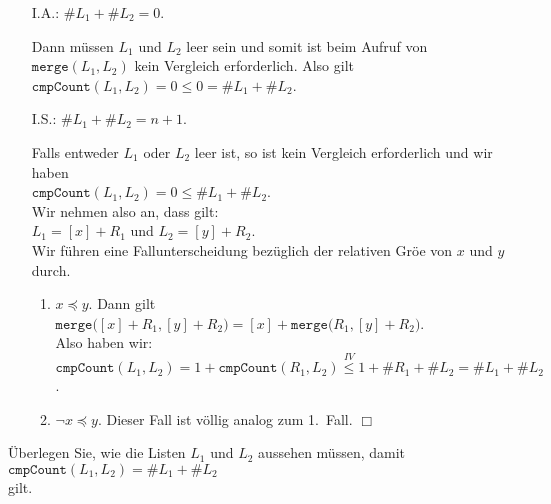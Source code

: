 \begin{enumerate}
\item[I.A.:] $\#L_1 + \#L_2=0$.

             Dann m\"ussen $L_1$ und $L_2$ leer sein und somit ist beim Aufruf
             von $\mathtt{merge}(L_1, L_2)$ kein Vergleich erforderlich.  Also gilt \\[0.2cm]
             \hspace*{1.3cm} $\mathtt{cmpCount}(L_1, L_2) = 0 \leq 0 = \#L_1 + \#L_2$.
\item[I.S.:] $\#L_1 + \#L_2 = n+1$.

             Falls entweder $L_1$ oder $L_2$ leer ist, so ist kein Vergleich erforderlich
             und wir haben 
             \\[0.2cm]
             \hspace*{1.3cm}
             $\mathtt{cmpCount}(L_1,L_2) = 0 \leq \#L_1 + \#L_2$.
             \\[0.2cm]
             Wir nehmen also an, dass gilt: \\[0.2cm]
             \hspace*{1.3cm} $L_1 = [x] + R_1$ \quad und \quad $L_2 = [y] + R_2$.
             \\[0.2cm]
             Wir f\"uhren eine Fallunterscheidung bez\"uglich der relativen Gr\"o\3e von $x$ und $y$ 
             durch.
             \begin{enumerate}
             \item $x \preceq y$.  Dann gilt \\[0.2cm]
                   \hspace*{1.3cm} 
                   $\mathtt{merge}\bigl([x] + R_1, [y] + R_2\bigr) = [x] +
                   \mathtt{merge}\bigl(R_1, [y] + R_2\bigr)$. \\[0.2cm]
                   Also haben wir: \\[0.2cm]
                   \hspace*{1.3cm} 
                   $\mathtt{cmpCount}(L_1, L_2) = 1 + \mathtt{cmpCount}(R_1, L_2) \stackrel{IV}{\leq} 1 + \#R_1 + \#L_2 = \#L_1 + \#L_2$.
             \item $\neg x \preceq y$.  Dieser Fall ist v\"ollig analog zum 1.~Fall. \hspace*{\fill} $\Box$
             \end{enumerate}
\end{enumerate}
\exercise
\"Uberlegen Sie, wie die Listen $L_1$ und $L_2$ aussehen m\"ussen, damit
\\[0.2cm]
\hspace*{1.3cm}
$\mathtt{cmpCount}(L_1, L_2) = \#L_1 + \#L_2$
\\[0.2cm]
gilt.
\vspace*{0.3cm}

